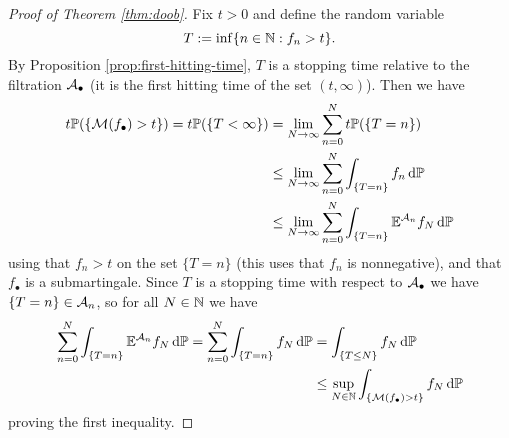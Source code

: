 \begin{proof}[Proof of Theorem \ref{thm:doob}]
  Fix $t > 0$ and define the random variable
  \begin{equation*}
    T :=  \inf\{n \in \mathbb{N} : f_n > t\}.
  \end{equation*}
  By Proposition \ref{prop:first-hitting-time}, $T$ is a stopping time relative to the filtration $\mathcal{A}_{\bullet}$ (it is the first hitting time of the set $(t,\infty)$).
  Then we have
  \begin{equation*} 
    \begin{aligned}
      t\mathbb{P}(\{\mathcal{M}(f_{\bullet}) > t\})
      = t\mathbb{P}(\{T < \infty\})
      &= \lim_{N \to \infty} \sum_{n = 0}^{N} t\mathbb{P}(\{T = n\}) \\
      &\leq \lim_{N \to \infty} \sum_{n = 0}^{N} \int_{\{T = n\}} f_n \, \mathrm{d}\mathbb{P}  \\ 
      &\leq \lim_{N \to \infty} \sum_{n = 0}^{N} \int_{\{T = n\}} \mathbb{E}^{\mathcal{A}_{n}} f_N \, \mathrm{d}\mathbb{P} 
    \end{aligned}
  \end{equation*}
  using that $f_n > t$ on the set $\{T = n\}$ (this uses that $f_{n}$ is nonnegative), and that $f_{\bullet}$ is a submartingale.
  Since $T$ is a stopping time with respect to $\mathcal{A}_{\bullet}$ we have $\{T = n\} \in \mathcal{A}_{n}$, so for all $N \in \mathbb{N}$ we have
  \begin{equation*}
    \begin{aligned}
     \sum_{n = 0}^{N} \int_{\{T = n\}} \mathbb{E}^{\mathcal{A}_{n}} f_N \, \mathrm{d}\mathbb{P} 
    =  \sum_{n = 0}^{N} \int_{\{T = n\}} f_{N} \, \mathrm{d}\mathbb{P} 
    &=  \int_{\{T \leq N\}} f_{N} \, \mathrm{d}\mathbb{P} \\
    &\leq \sup_{N \in \mathbb{N}} \int_{\{\mathcal{M}(f_{\bullet}) > t\}} f_{N} \, \mathrm{d}\mathbb{P}
  \end{aligned}
  \end{equation*}
  proving the first inequality.


\end{proof}
